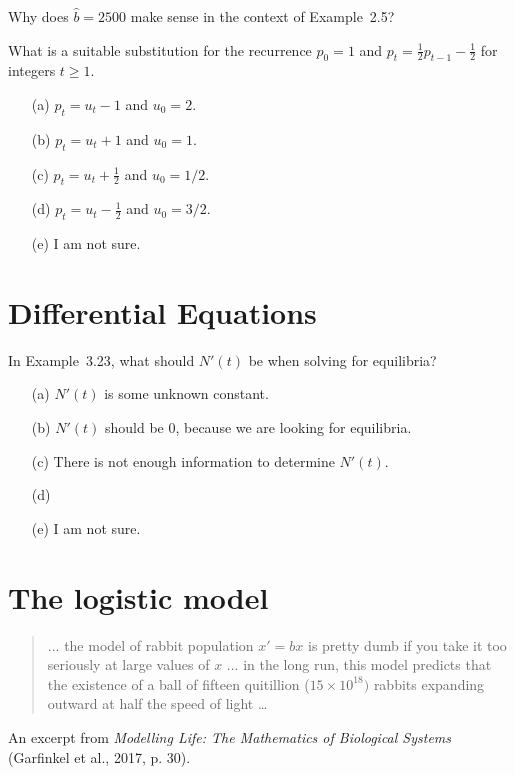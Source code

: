 \documentclass[14pt]{beamer}
\begin{document}
\begin{frame}
  Why does \(\hat{b} = 2500\) make sense in the context of Example~2.5?
\end{frame}


\begin{frame}
  What is a suitable substitution for the recurrence \(p_{0} = 1\) and \(p_{t} = \frac{1}{2} p_{t-1} - \frac{1}{2}\) for integers \(t \ge 1\).

  \begin{itemize} \setlength\itemsep{1ex}
    \item[(a)] \(p_{t} = u_{t} - 1\) and \(u_{0} = 2\).
    \item[(b)] \(p_{t} = u_{t} + 1\) and \(u_{0} = 1\).
    \item[(c)] \(p_{t} = u_{t} + \frac{1}{2}\) and \(u_{0} = 1/2\).
    \item[(d)] \(p_{t} = u_{t} - \frac{1}{2}\) and \(u_{0} = 3/2\).
    \item[(e)] I am not sure. 
  \end{itemize}
\end{frame}

\section{Differential Equations}

\begin{frame}
  In Example~3.23, what should \(N'(t)\) be when solving for equilibria?

  \begin{itemize} \setlength\itemsep{1ex}
    \item[(a)] \(N'(t)\) is some unknown constant.
    \item[(b)] \(N'(t)\) should be \(0\), because we are looking for equilibria.
    \item[(c)] There is not enough information to determine \(N'(t)\).
    \item[(d)] 
    \item[(e)] I am not sure. 
  \end{itemize}
\end{frame}


\section{The logistic model}

\begin{frame}
  \small

  \begin{quote}
    ... the model of rabbit population \(x' = bx\) is pretty dumb if you take it too seriously at large values of \(x\) ... in the long run, this model predicts that the existence of a ball of fifteen quitillion (\(15 \times 10^{18})\) rabbits expanding outward at half the speed of light \ldots{}
  \end{quote}

  An excerpt from \emph{Modelling Life: The Mathematics of Biological Systems} (Garfinkel et al., 2017, p. 30).
\end{frame}
\end{document}
